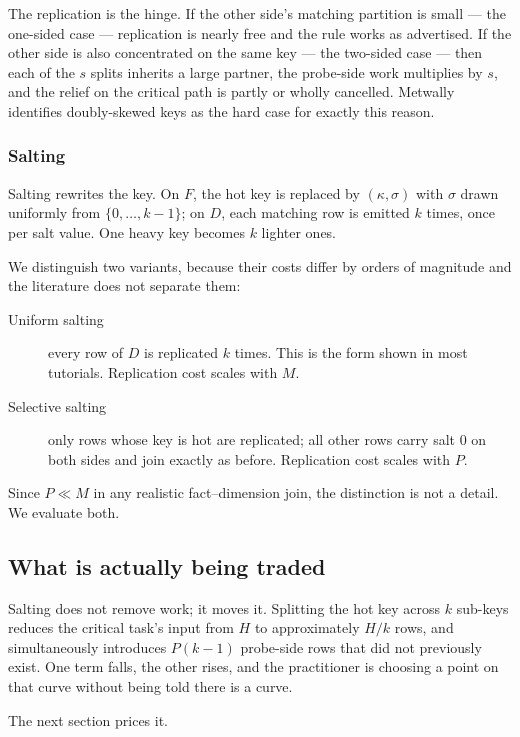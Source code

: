 The replication is the hinge. If the other side's matching partition is small
--- the one-sided case --- replication is nearly free and the rule works as
advertised. If the other side is also concentrated on the same key --- the
two-sided case --- then each of the $s$ splits inherits a large partner, the
probe-side work multiplies by $s$, and the relief on the critical path is
partly or wholly cancelled. Metwally~\cite{metwally2025amjoin} identifies
doubly-skewed keys as the hard case for exactly this reason.

\subsubsection{Salting}
Salting rewrites the key. On $F$, the hot key is replaced by
$(\kappa, \sigma)$ with $\sigma$ drawn uniformly from $\{0,\dots,k-1\}$; on
$D$, each matching row is emitted $k$ times, once per salt value. One heavy
key becomes $k$ lighter ones.

We distinguish two variants, because their costs differ by orders of magnitude
and the literature does not separate them:

\begin{description}
\item[Uniform salting] every row of $D$ is replicated $k$ times. This is the
form shown in most tutorials. Replication cost scales with $M$.
\item[Selective salting] only rows whose key is hot are replicated; all other
rows carry salt $0$ on both sides and join exactly as before. Replication cost
scales with $P$.
\end{description}

Since $P \ll M$ in any realistic fact--dimension join, the distinction is not a
detail. We evaluate both.

\subsection{What is actually being traded}

Salting does not remove work; it moves it. Splitting the hot key across $k$
sub-keys reduces the critical task's input from $H$ to approximately $H/k$
rows, and simultaneously introduces $P(k-1)$ probe-side rows that did not
previously exist. One term falls, the other rises, and the practitioner is
choosing a point on that curve without being told there is a curve.

The next section prices it.
